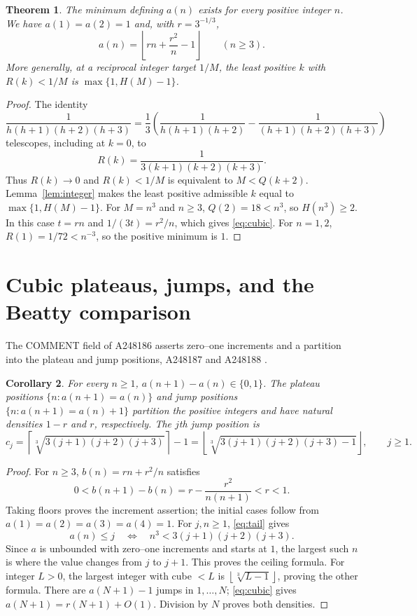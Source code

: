 \documentclass[11pt]{article}
\newtheorem{theorem}{Theorem}
\newtheorem{corollary}[theorem]{Corollary}
\newcommand{\floor}[1]{\left\lfloor #1\right\rfloor}
\newcommand{\ceil}[1]{\left\lceil #1\right\rceil}
\begin{document}
\begin{theorem}\label{thm:cubic}
The minimum defining $a(n)$ exists for every positive integer $n$.
We have $a(1)=a(2)=1$ and, with $r=3^{-1/3}$,
\begin{equation}\label{eq:cubic}
 a(n)=\floor{rn+\frac{r^2}{n}-1}\qquad(n\geq3).
\end{equation}
More generally, at a reciprocal integer target $1/M$, the least
positive $k$ with $R(k)<1/M$ is $\max\{1,H(M)-1\}$.
\end{theorem}
\begin{proof}
The identity
\[
 \frac1{h(h+1)(h+2)(h+3)}
 =\frac13\left(\frac1{h(h+1)(h+2)}-
                   \frac1{(h+1)(h+2)(h+3)}\right)
\]
telescopes, including at $k=0$, to
\begin{equation}\label{eq:tail}
 R(k)=\frac1{3(k+1)(k+2)(k+3)}.
\end{equation}
Thus $R(k)\to0$ and $R(k)<1/M$ is equivalent to $M<Q(k+2)$.
Lemma~\ref{lem:integer} makes the least positive admissible $k$ equal
to $\max\{1,H(M)-1\}$. For $M=n^3$ and $n\geq3$, $Q(2)=18<n^3$,
so $H(n^3)\geq2$. In this case $t=rn$ and $1/(3t)=r^2/n$,
which gives \eqref{eq:cubic}. For $n=1,2$, $R(1)=1/72<n^{-3}$,
so the positive minimum is $1$.
\end{proof}

\section{Cubic plateaus, jumps, and the Beatty comparison}
The COMMENT field of A248186 asserts zero--one increments and a
partition into the plateau and jump positions, A248187 and A248188
\cite{cubic,plateaus,jumps}.

\begin{corollary}\label{cor:jumps}
For every $n\geq1$, $a(n+1)-a(n)\in\{0,1\}$. The plateau positions
$\{n:a(n+1)=a(n)\}$ and jump positions $\{n:a(n+1)=a(n)+1\}$
partition the positive integers and have natural densities $1-r$
and $r$, respectively. The $j$th jump position is
\begin{equation}\label{eq:jump}
 c_j=\ceil{\sqrt[3]{3(j+1)(j+2)(j+3)}}-1
     =\floor{\sqrt[3]{3(j+1)(j+2)(j+3)-1}},\qquad j\geq1.
\end{equation}
\end{corollary}
\begin{proof}
For $n\geq3$, $b(n)=rn+r^2/n$ satisfies
\[
 0<b(n+1)-b(n)=r-\frac{r^2}{n(n+1)}<r<1.
\]
Taking floors proves the increment assertion; the initial cases follow
from $a(1)=a(2)=a(3)=a(4)=1$. For $j,n\geq1$, \eqref{eq:tail} gives
\begin{equation}\label{eq:level}
 a(n)\leq j\quad\Longleftrightarrow\quad
 n^3<3(j+1)(j+2)(j+3).
\end{equation}
Since $a$ is unbounded with zero--one increments and starts at $1$,
the largest such $n$ is where the value changes from $j$ to $j+1$.
This proves the ceiling formula. For integer $L>0$, the largest integer
with cube $<L$ is $\floor{\sqrt[3]{L-1}}$, proving the other formula.
There are $a(N+1)-1$ jumps in $1,\ldots,N$; \eqref{eq:cubic} gives
$a(N+1)=r(N+1)+O(1)$. Division by $N$ proves both densities.
\end{proof}
\end{document}
